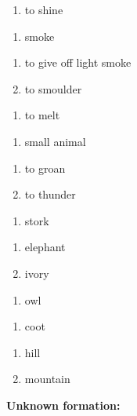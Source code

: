 \begin{enumerate}
\item to shine
\end{enumerate}
\begin{enumerate}
\item smoke
\end{enumerate}
\begin{enumerate}
\item to give off light smoke
\item to smoulder
\end{enumerate}
\begin{enumerate}
\item to melt
\end{enumerate}
\begin{enumerate}
\item small animal
\end{enumerate}
\begin{enumerate}
\item to groan
\item to thunder
\end{enumerate}
\begin{enumerate}
\item stork
\end{enumerate}
\begin{enumerate}
\item elephant
\item ivory
\end{enumerate}
\begin{enumerate}
\item owl
\end{enumerate}
\begin{enumerate}
\item coot
\end{enumerate}
\begin{enumerate}
\item hill
\item mountain
\end{enumerate}
\noindent\textbf{Unknown formation:}\\


